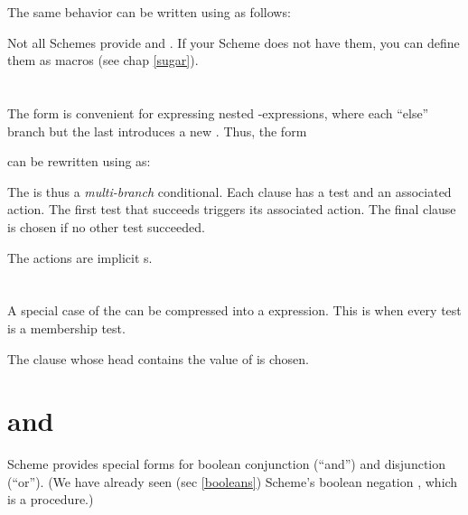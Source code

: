 The same behavior can be written using  as
follows:


\n Not all Schemes provide  and .
If your Scheme does not have them, you can 
define them as macros (see chap \ref{sugar}).

\section{}

The  form is convenient for expressing nested
-expressions, where each ``else'' branch but the last
introduces a new .  Thus, the form 


can be rewritten using  as:


The  is thus a {\em multi-branch} conditional.  Each
clause has a test and an associated action.  The first
test that succeeds triggers its associated action.  The
final  clause is chosen if no other test
succeeded.

The  actions are implicit s.

\section{}

A special case of the  can be compressed into a
 expression.  This is when every test is a
membership test.


The clause whose head contains the value of  is chosen.

\section{ and }

Scheme provides special forms for boolean conjunction
(``and'') and disjunction (``or'').  (We have already
seen (sec \ref{booleans}) Scheme's boolean negation
, which is a 
procedure.) 

